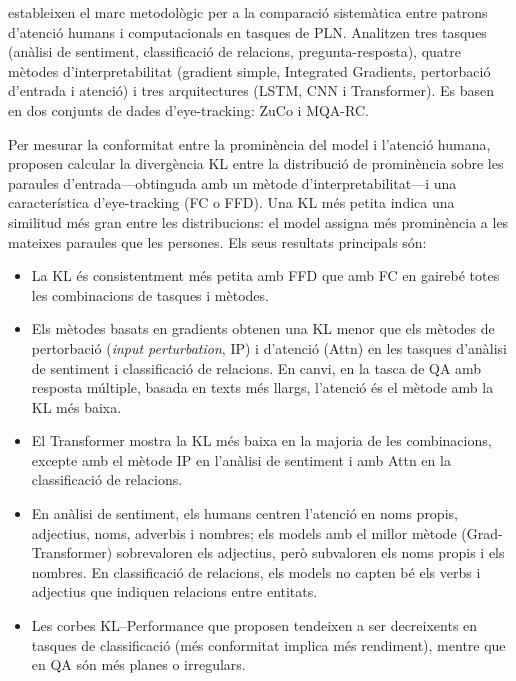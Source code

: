 \textcite{ikhwantriLookingDeepEyes2023} estableixen el marc metodològic per a la comparació sistemàtica entre patrons d'atenció humans i computacionals en tasques de PLN.
Analitzen tres tasques (anàlisi de sentiment, classificació de relacions, pregunta-resposta), quatre mètodes d'interpretabilitat (gradient simple, Integrated Gradients, pertorbació d'entrada i atenció) i tres arquitectures (LSTM, CNN i Transformer).
Es basen en dos conjunts de dades d'eye-tracking: ZuCo i MQA-RC.

Per mesurar la conformitat entre la prominència del model i l'atenció humana, proposen calcular la divergència KL entre la distribució de prominència sobre les paraules d'entrada---obtinguda amb un mètode d'interpretabilitat---i una característica d'eye-tracking (FC o FFD).
Una KL més petita indica una similitud més gran entre les distribucions: el model assigna més prominència a les mateixes paraules que les persones.
Els seus resultats principals són:

\begin{itemize}
    \item La KL és consistentment més petita amb FFD que amb FC en gairebé totes les combinacions de tasques i mètodes.
    \item Els mètodes basats en gradients obtenen una KL menor que els mètodes de pertorbació (\textit{input perturbation}, IP) i d'atenció (Attn) en les tasques d'anàlisi de sentiment i classificació de relacions. En canvi, en la tasca de QA amb resposta múltiple, basada en texts més llargs, l'atenció és el mètode amb la KL més baixa.
    \item El Transformer mostra la KL més baixa en la majoria de les combinacions, excepte amb el mètode IP en l'anàlisi de sentiment i amb Attn en la classificació de relacions.
    \item En anàlisi de sentiment, els humans centren l'atenció en noms propis, adjectius, noms, adverbis i nombres; els models amb el millor mètode (Grad-Transformer) sobrevaloren els adjectius, però subvaloren els noms propis i els nombres. En classificació de relacions, els models no capten bé els verbs i adjectius que indiquen relacions entre entitats.
    \item Les corbes KL--Performance que proposen tendeixen a ser decreixents en tasques de classificació (més conformitat implica més rendiment), mentre que en QA són més planes o irregulars.
\end{itemize}

